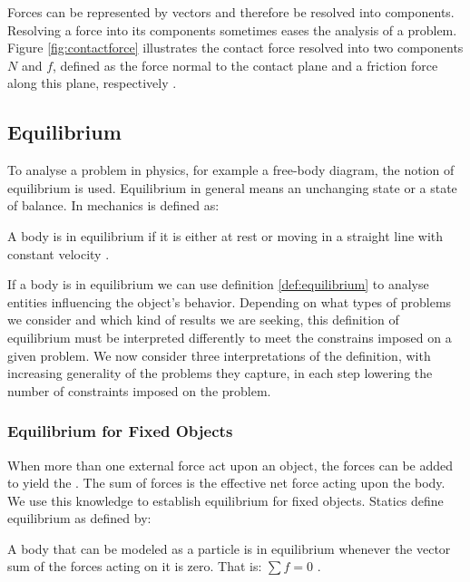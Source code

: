 Forces can be represented by vectors and therefore be resolved into
components. Resolving a force into its components sometimes eases the
analysis of a problem. Figure \vref{fig:contactforce} illustrates the contact force
resolved into two components $N$ and $f$, defined as the force normal
to the contact plane and a friction force along this plane,
respectively .

\subsection{Equilibrium}
\label{sec:equilibrium}
To analyse a problem in physics, for example a free-body diagram,
the notion of equilibrium is used.
%
Equilibrium in general means an unchanging state or a state of
balance. In mechanics  is defined as:

\begin{definition}
\label{def:equilibrium}
A body is in equilibrium if it is either at rest or moving in a
straight line with constant velocity .
\end{definition}

If a body is in equilibrium we can use definition
\vref{def:equilibrium} to analyse entities influencing the object's
behavior.
%
Depending on what types of problems we consider and which kind of
results we are seeking, this definition of equilibrium must be
interpreted differently to meet the constrains imposed on a given
problem.
%
We now consider three interpretations of the definition, with
increasing generality of the problems they capture, in each step
lowering the number of constraints imposed on the problem. \\

\subsubsection{Equilibrium for Fixed Objects}
\label{sec:equilibrium_for_fixed_objects}
When more than one external force act upon an object, the forces can
be added to yield the . The sum of forces is the
effective net force acting upon the body. We use this knowledge to
establish equilibrium for fixed objects.
Statics define equilibrium as  defined by:

\begin{definition}
\label{static-equilibrium}
A body that can be modeled as a particle is in equilibrium whenever
the vector sum of the forces acting on it is zero.
That is: $\sum f = 0$
.
\end{definition}

